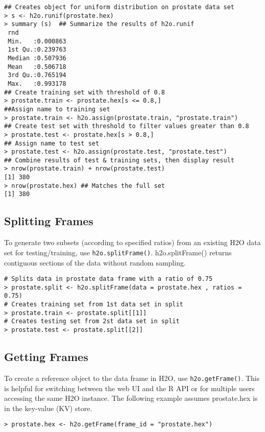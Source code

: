 {\begin{lstlisting}[style=R]
## Creates object for uniform distribution on prostate data set
> s <- h2o.runif(prostate.hex)
> summary (s)  ## Summarize the results of h2o.runif
 rnd               
 Min.   :0.000863  
 1st Qu.:0.239763  
 Median :0.507936  
 Mean   :0.506718  
 3rd Qu.:0.765194  
 Max.   :0.993178  
## Create training set with threshold of 0.8
> prostate.train <- prostate.hex[s <= 0.8,]
##Assign name to training set
> prostate.train <- h2o.assign(prostate.train, "prostate.train")
## Create test set with threshold to filter values greater than 0.8
> prostate.test <- prostate.hex[s > 0.8,]
## Assign name to test set
> prostate.test <- h2o.assign(prostate.test, "prostate.test")
## Combine results of test & training sets, then display result
> nrow(prostate.train) + nrow(prostate.test)
[1] 380
> nrow(prostate.hex) ## Matches the full set
[1] 380
\end{lstlisting}
 

\subsection{Splitting Frames}

To generate two subsets (according to specified ratios) from an existing H2O data set for testing/training, use {\texttt{h2o.splitFrame()}}.  h2o.splitFrame() returns contiguous sections of the data without random sampling.

\begin{lstlisting}[style=R]
# Splits data in prostate data frame with a ratio of 0.75
> prostate.split <- h2o.splitFrame(data = prostate.hex , ratios = 0.75)
# Creates training set from 1st data set in split
> prostate.train <- prostate.split[[1]]
# Creates testing set from 2st data set in split
> prostate.test <- prostate.split[[2]]
\end{lstlisting}

\subsection{Getting Frames}

To create a reference object to the data frame in H2O, use {\texttt{h2o.getFrame()}}. This is helpful for  switching between the web UI and the R API or for multiple users accessing the same H2O instance. The following example assumes prostate.hex is in the key-value (KV) store.

\smallskip
\begin{lstlisting}[style=R]
> prostate.hex <- h2o.getFrame(frame_id = "prostate.hex")
\end{lstlisting}


}
